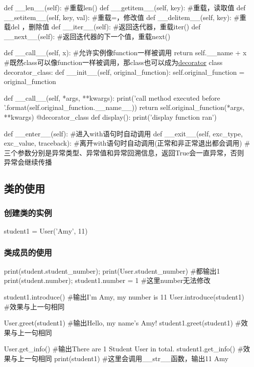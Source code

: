 \begin{codeblock}[language=python, caption={Special members for class}]
        def __len__(self): #重载len()
        def __getitem__(self, key): #重载\lbrack\rbrack，读取值
        def __setitem__(self, key, val): #重载\lbrack\rbrack=，修改值
        def __delitem__(self, key): #重载del \lbrack\rbrack，删除值
        def __iter__(self): #返回迭代器，重载iter()
        def __next__(self): #返回迭代器的下一个值，重载next()

        def __call__(self, x): #允许实例像function一样被调用
            return self.__name + x
        #既然class可以像function一样被调用，那class也可以成为\hyperref[subsubsec:decorator]{\underline{decorator}}
        class decorator_class:
            def __init__(self, original_function):
                self.original_function = original_function

            def __call__(self, *args, **kwargs):
                print('call method executed before {}'.format(self.original_function.__name__))
                return self.original_function(*args, **kwargs)
        @decorator_class
        def display():
            print('display function ran')

        def __enter__(self): #进入with语句时自动调用
        def __exit__(self, exc_type, exc_value, traceback): 
        #离开with语句时自动调用(正常和非正常退出都会调用)
        #三个参数分别是异常类型、异常值和异常回溯信息，返回True会一直异常，否则异常会继续传播 
      \end{codeblock}
        
  \subsection{类的使用}
    \subsubsection{创建类的实例}
      \begin{codeblock}[language=python, caption={Create an instance of class}]
        student1 = User('Amy', 11) 
      \end{codeblock}

    \subsubsection{类成员的使用}
      \begin{codeblock}[language=python, caption={Using class members}]
        print(student.student_number); print(User.student_number) #都输出1
        print(student.number); student1.number = 1 #这里number无法修改

        student1.introduce() #输出I'm Amy, my number is 11
        User.introduce(student1) #效果与上一句相同

        User.greet(student1) #输出Hello, my name's Amy!
        student1.greet(student1) #效果与上一句相同

        User.get_info() #输出There are 1 Student User in total.
        student1.get_info() #效果与上一句相同
        print(student1) #这里会调用\_\_str\_\_函数，输出11 Amy
      \end{codeblock}

